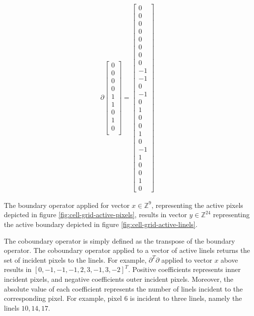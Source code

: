\begin{example}
\[\begin{array}{ll}
	\partial \left[ \begin{array}{l}
					0\\
					0\\
					0\\
					0\\
					1\\
					1\\
					0\\
					1\\
					0\\
					\end{array}\right] =  \left[ \begin{array}{l}
											0\\
											0\\
											0\\
											0\\
											0\\
											0\\
											0\\
											0\\
											-1\\
											-1\\
											0\\
											-1\\
											0\\
											1\\
											0\\
											0\\
											1\\
											0\\
											-1\\
											1\\
											0\\
											0\\
											1\\
											0
										\end{array}\right]
	 
   \end{array}
\]



The boundary operator applied for vector $x \in \mathbb{Z}^9$, representing the active pixels depicted in figure \ref{fig:cell-grid-active-pixels}, results in vector $y \in \mathbb{Z}^{24}$ representing the active boundary depicted in figure \ref{fig:cell-grid-active-linels}.

The coboundary operator is simply defined as the transpose of the boundary operator. The coboundary operator applied to a vector of active linels returns the set of incident pixels to the linels. For example, $\partial^{T}\partial$ applied to vector $x$ above results in $[0,-1,-1,-1,2,3,-1,3,-2]^T$. Positive coefficients represents inner incident pixels, and negative coefficients outer incident pixels. Moreover, the absolute value of each coefficient represents the number of linels incident to the corresponding pixel. For example, pixel $6$ is incident to three linels, namely the linels $10,14,17$.

\end{example}

